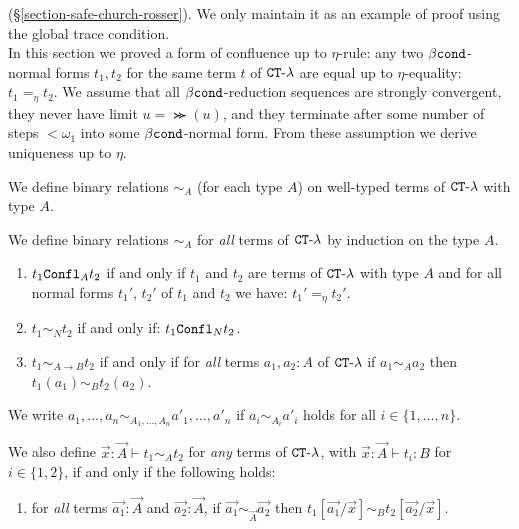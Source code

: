 \newcommand{\Confl} {{\tt Confl}}

(\S \ref{section-safe-church-rosser}). 
We only maintain it as an example of proof using the global trace condition.
\\

In this section we proved a form of confluence up to $\eta$-rule: any two $\beta{\tt cond}$-normal forms $t_1, t_2$ for
the same term $t$ of ${ {\tt CT}\mbox{-}\lambda}$ are equal up to $\eta$-equality: $t_1 =_\eta t_2$.
We assume that all $\beta{\tt cond}$-reduction sequences are strongly convergent, they never have limit $u = \Succ(u)$, and they terminate after some number of steps $<\omega_1$ into some $\beta{\tt cond}$-normal form. From these assumption we derive uniqueness up to $\eta$.

We define binary relations $\sim_A$ (for each type $A$) on well-typed terms of ${ {\tt CT}\mbox{-}\lambda}$ with type $A$.
\begin{definition}
  We define binary relations $\sim_A$ for \emph{all} terms of ${ {\tt CT}\mbox{-}\lambda}$
  by induction on the type $A$. 
  \begin{enumerate}
\item
  $t_1 \Confl_A t_2$ if and only if $t_1$ and $t_2$ are terms of ${ {\tt CT}\mbox{-}\lambda}$ with type $A$ and for all normal forms $t_1'$, $t_2'$ of $t_1$ and $t_2$ we have: $t_1' =_\eta t_2'$.
\item
    $t_1 \sim_N t_2$ if and only if: $t_1 \Confl_N t_2$.
\item
    $t_1 \sim_{A\rightarrow B} t_2$ if and only if for \emph{all} terms $a_1,a_2:A$ of ${ {\tt CT}\mbox{-}\lambda}$ if
    $a_1 \sim_A a_2$ then $t_1(a_1) \sim_B t_2(a_2)$.
  \end{enumerate}
  We write $a_1,\ldots,a_n \sim_{A_1,\ldots,A_n} a'_1,\ldots,a'_n$ if $a_i\sim_{A_i} a'_i$ holds
  for all $i\in\{1,\ldots,n\}$. 
  
  We also define $\vec{x}:\vec{A} \vdash  t_1 \sim_{A} t_2$ for \emph{any} terms of ${ {\tt CT}\mbox{-}\lambda}$,
  with $\vec{x}:\vec{A}\vdash t_i:B$ for $i\in\{1,2\}$, if and only if the following holds:
  \begin{enumerate}
  \item[3]
    for \emph{all} terms $\vec{a_1}:\vec{A}$ and $\vec{a_2}:\vec{A}$,
    if $\vec{a_1}\sim_{\vec{A}}\vec{a_2}$ then $t_1[\vec{a_1}/\vec{x}] \sim_B t_2[\vec{a_2}/\vec{x}]$. 
  \end{enumerate}  
\end{definition}

